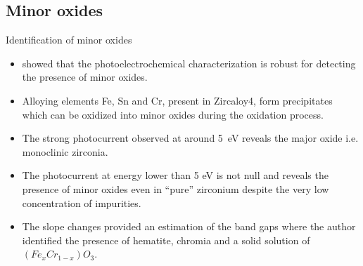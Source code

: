 \documentclass[10pt,compress]{beamer}
\begin{document}
\subsection{Minor oxides}
    \begin{frame}[allowframebreaks=1.0]{Identification of minor oxides}
        \begin{itemize}
            \item \citet{benaboud2007} showed that the photoelectrochemical characterization 
            is robust for detecting the presence of minor oxides. 
            \item Alloying elements Fe, Sn and Cr, present in Zircaloy4, form precipitates 
            which can be oxidized into minor oxides during the oxidation process.
            \item The strong photocurrent observed at around 5~eV 
                  reveals the major oxide i.e. monoclinic zirconia. 
            \item The photocurrent at energy lower than 5 eV is not null and reveals the 
                  presence of minor oxides even in “pure” zirconium despite the very low 
                  concentration of impurities. 
            \item The slope changes provided an estimation of the band gaps where the author 
                  identified the presence of hematite, chromia and a solid solution of 
                  $(Fe_xCr_{1-x})O_3$. 
        \end{itemize}


\end{frame}
\end{document}
